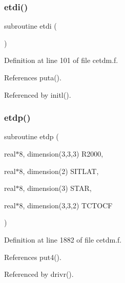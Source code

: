 \subsubsection{\texorpdfstring{etdi()}{etdi()}}
{\footnotesize\ttfamily subroutine etdi (\begin{DoxyParamCaption}{ }\end{DoxyParamCaption})}



Definition at line 101 of file cetdm.\+f.



References puta().



Referenced by initl().

\mbox{\label{cetdm_8f_adb3cbf5a50a988616633ce79011c32e8}} 
\subsubsection{\texorpdfstring{etdp()}{etdp()}}
{\footnotesize\ttfamily subroutine etdp (\begin{DoxyParamCaption}\item[{real$\ast$8, dimension(3,3,3)}]{R2000,  }\item[{real$\ast$8, dimension(2)}]{S\+I\+T\+L\+AT,  }\item[{real$\ast$8, dimension(3)}]{S\+T\+AR,  }\item[{real$\ast$8, dimension(3,3,2)}]{T\+C\+T\+O\+CF }\end{DoxyParamCaption})}



Definition at line 1882 of file cetdm.\+f.



References put4().



Referenced by drivr().

